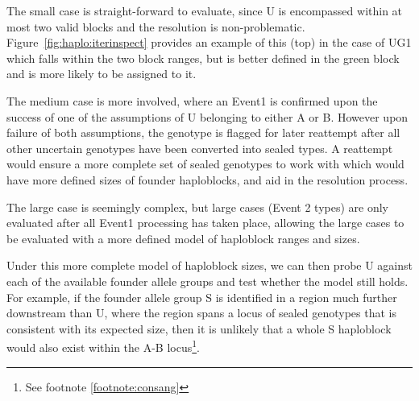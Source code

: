 \begin{description}
\end{description}



The small case is straight-forward to evaluate, since U is encompassed within at most two valid blocks and the resolution is non-problematic. Figure~\ref{fig:haplo:iterinspect} provides an example of this (top) in the case of UG1 which falls within the two block ranges, but is better defined in the green block and is more likely to be assigned to it.

The medium case is more involved, where an Event1 is confirmed upon the success of one of the assumptions of U belonging to either A or B. However upon failure of both assumptions, the genotype is flagged for later reattempt after all other uncertain genotypes have been converted into sealed types.  A reattempt would ensure a more complete set of sealed genotypes to work with which would have more defined sizes of founder haploblocks, and aid in the resolution process.

The large case is seemingly complex, but large cases (Event 2 types) are only evaluated after all Event1 processing has taken place, allowing the large cases to be evaluated with a more defined model of haploblock ranges and sizes.

Under this more complete model of haploblock sizes, we can then probe U against each of the available founder allele groups and test whether the model still holds. For example, if the founder allele group S is identified in a region much further downstream than U, where the region spans a locus of sealed genotypes that is consistent with its expected size, then it is unlikely that a whole S  haploblock would also exist within the A-B locus\footnote{See footnote \ref{footnote:consang}}.


